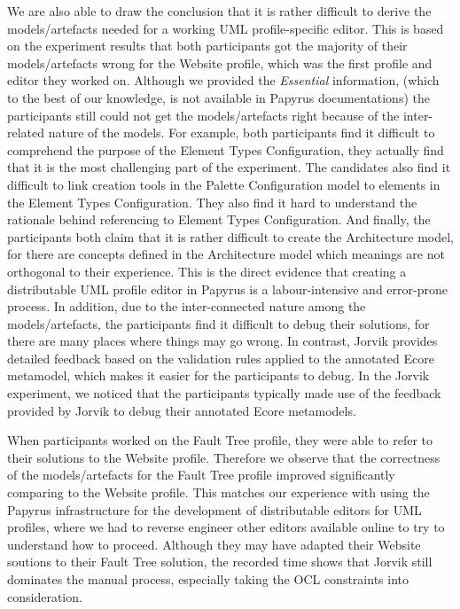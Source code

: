 We are also able to draw the conclusion that it is rather difficult to derive the models/artefacts needed for a working UML profile-specific editor. 
This is based on the experiment results that both participants got the majority of their models/artefacts wrong for the Website profile, which was the first profile and editor they worked on.
Although we provided the \textit{Essential} information, (which to the best of our knowledge, is not available in Papyrus documentations) the participants still could not get the models/artefacts right because of the inter-related nature of the models.
For example, both participants find it difficult to comprehend the purpose of the Element Types Configuration, they actually find that it is the most challenging part of the experiment.
The candidates also find it difficult to link creation tools in the Palette Configuration model to elements in the Element Types Configuration. 
They also find it hard to understand the rationale behind referencing to Element Types Configuration.
And finally, the participants both claim that it is rather difficult to create the Architecture model, for there are concepts defined in the Architecture model which meanings are not orthogonal to their experience.
This is the direct evidence that creating a distributable UML profile editor in Papyrus is a labour-intensive and error-prone process.
In addition, due to the inter-connected nature among the models/artefacts, the participants find it difficult to debug their solutions, for there are many places where things may go wrong.
In contrast, Jorvik provides detailed feedback based on the validation rules applied to the annotated Ecore metamodel, which makes it easier for the participants to debug.
In the Jorvik experiment, we noticed that the participants typically made use of the feedback provided by Jorvik to debug their annotated Ecore metamodels.

When participants worked on the Fault Tree profile, they were able to refer to their solutions to the Website profile. 
Therefore we observe that the correctness of the models/artefacts for the Fault Tree profile improved significantly comparing to the Website profile. This matches our experience with using the Papyrus infrastructure for the development of distributable editors for UML profiles, where we had to reverse engineer other editors available online to try to understand how to proceed.
Although they may have adapted their Website soutions to their Fault Tree solution, the recorded time shows that Jorvik still dominates the manual process, especially taking the OCL constraints into consideration.

